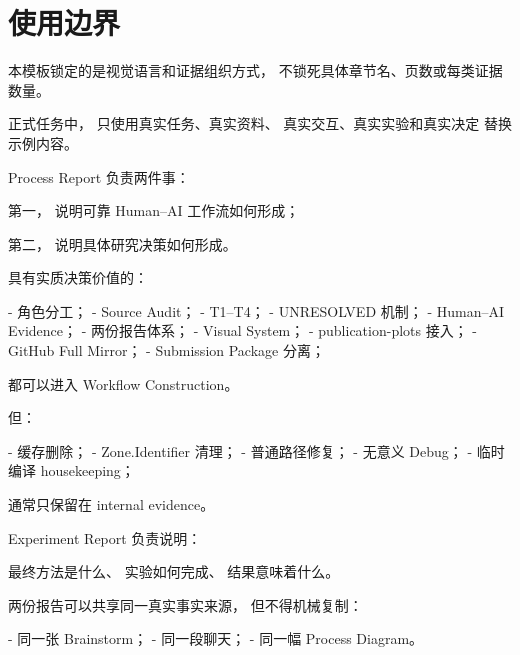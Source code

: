 \documentclass[11pt,a4paper]{article}
\begin{document}
\clearpage
\section{使用边界}

本模板锁定的是视觉语言和证据组织方式，
不锁死具体章节名、页数或每类证据数量。

正式任务中，
只使用真实任务、真实资料、
真实交互、真实实验和真实决定
替换示例内容。

Process Report 负责两件事：

第一，
说明可靠 Human--AI 工作流如何形成；

第二，
说明具体研究决策如何形成。

具有实质决策价值的：

- 角色分工；
- Source Audit；
- T1--T4；
- UNRESOLVED 机制；
- Human--AI Evidence；
- 两份报告体系；
- Visual System；
- publication-plots 接入；
- GitHub Full Mirror；
- Submission Package 分离；

都可以进入 Workflow Construction。

但：

- 缓存删除；
- Zone.Identifier 清理；
- 普通路径修复；
- 无意义 Debug；
- 临时编译 housekeeping；

通常只保留在 internal evidence。

Experiment Report 负责说明：

最终方法是什么、
实验如何完成、
结果意味着什么。

两份报告可以共享同一真实事实来源，
但不得机械复制：

- 同一张 Brainstorm；
- 同一段聊天；
- 同一幅 Process Diagram。
\end{document}
